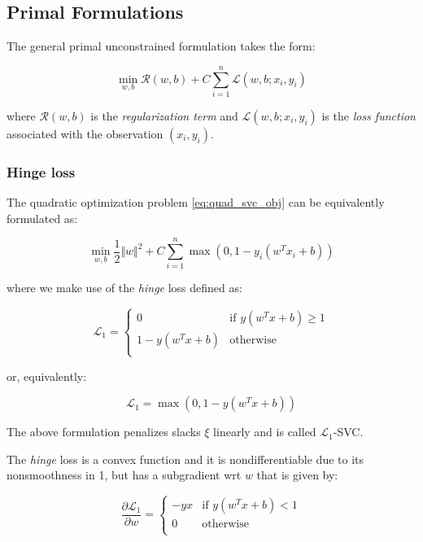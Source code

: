 \subsection{Primal Formulations}

The general primal unconstrained formulation takes the form:

\begin{equation} \label{eq:primal_svc}
    \min_{w,b} \mathcal{R}(w,b) + C \sum_{i=1}^n \mathcal{L}(w,b;x_i,y_i)
\end{equation}

where $\mathcal{R}(w, b)$ is the \emph{regularization term} and $\mathcal{L}(w,b;x_i,y_i)$ is the \emph{loss function} associated with the observation $(x_i,y_i)$.

\subsubsection{Hinge loss}

The quadratic optimization problem \ref{eq:quad_svc_obj} can be equivalently formulated as: 

\begin{equation} \label{eq:svc_hinge}
    \min_{w,b} \frac{1}{2} \Vert w \Vert^2 + C \sum_{i=1}^n \max(0, 1 - y_i (w^T x_i + b))
\end{equation}

where we make use of the \emph{hinge} loss defined as:

\begin{equation} \label{eq:hinge_loss1}
	\mathcal{L}_1 = 
	\begin{cases}
		0 & \text{if } y (w^T x + b) \geq 1 \\
		1 - y (w^T x + b) & \text{otherwise} \\
	\end{cases}
\end{equation}

or, equivalently:

\begin{equation} \label{eq:hinge_loss2}
	\mathcal{L}_1 = \max(0, 1 - y (w^T x + b))
\end{equation}

The above formulation penalizes slacks $\xi$ linearly and is called $\mathcal{L}_1$-SVC.

The \emph{hinge} loss is a convex function and it is nondifferentiable due to its nonsmoothness in 1, but has a subgradient wrt $w$ that is given by:

\begin{equation} \label{eq:hinge_loss_der}
    \frac{\partial \mathcal{L}_1}{\partial w}=
        \begin{cases}
            -y x & \text{if } y (w^T x + b) < 1 \\
            0 & \text{otherwise} \\ 
        \end{cases}
\end{equation}

